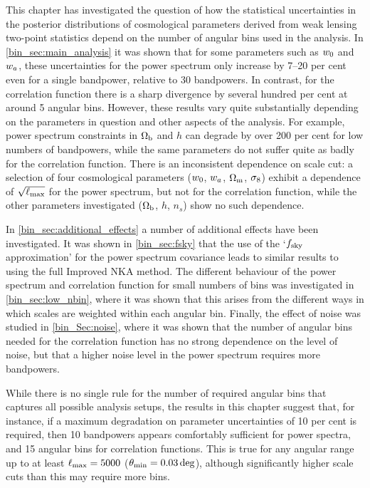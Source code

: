 This chapter has investigated the question of how the statistical uncertainties in the posterior distributions of cosmological parameters derived from weak lensing two-point statistics depend on the number of angular bins used in the analysis. In \autoref{bin_sec:main_analysis} it was shown that for some parameters such as $w_0$ and $w_a$, these uncertainties for the power spectrum only increase by 7--20 per cent even for a single bandpower, relative to 30 bandpowers. In contrast, for the correlation function there is a sharp divergence by several hundred per cent at around 5 angular bins. However, these results vary quite substantially depending on the parameters in question and other aspects of the analysis. For example, power spectrum constraints in $\Omega_\text{b}$ and $h$ can degrade by over 200 per cent for low numbers of bandpowers, while the same parameters do not suffer quite as badly for the correlation function. There is an inconsistent dependence on scale cut: a selection of four cosmological parameters ($w_0$, $w_a$, $\Omega_\text{m}$, $\sigma_8$) exhibit a dependence of $\sqrt{\ell_\text{max}}$ for the power spectrum, but not for the correlation function, while the other parameters investigated ($\Omega_\text{b}$, $h$, $n_s$) show no such dependence.

In \autoref{bin_sec:additional_effects} a number of additional effects have been investigated. It was shown in \autoref{bin_sec:fsky} that the use of the `$f_\text{sky}$ approximation' for the power spectrum covariance leads to similar results to using the full Improved NKA method. The different behaviour of the power spectrum and correlation function for small numbers of bins was investigated in \autoref{bin_sec:low_nbin}, where it was shown that this arises from the different ways in which scales are weighted within each angular bin. Finally, the effect of noise was studied in \autoref{bin_Sec:noise}, where it was shown that the number of angular bins needed for the correlation function has no strong dependence on the level of noise, but that a higher noise level in the power spectrum requires more bandpowers.

While there is no single rule for the number of required angular bins that captures all possible analysis setups, the results in this chapter suggest that, for instance, if a maximum degradation on parameter uncertainties of 10 per cent is required, then 10 bandpowers appears comfortably sufficient for power spectra, and 15 angular bins for correlation functions. This is true for any angular range up to at least $\ell_\text{max} = 5000$ ($\theta_\text{min} = 0.03\,\text{deg}$), although significantly higher scale cuts than this may require more bins.


% 
